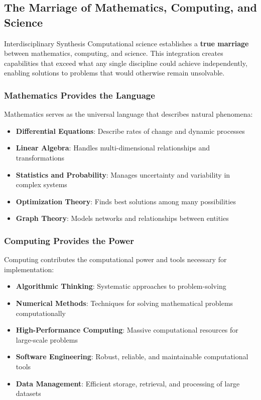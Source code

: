 \subsection{The Marriage of Mathematics, Computing, and Science}

\begin{highlightbox}{Interdisciplinary Synthesis}
Computational science establishes a \textbf{true marriage} between mathematics, computing, and science. This integration creates capabilities that exceed what any single discipline could achieve independently, enabling solutions to problems that would otherwise remain unsolvable.
\end{highlightbox}

\subsubsection{Mathematics Provides the Language}

Mathematics serves as the universal language that describes natural phenomena:
\begin{itemize}
    \item \textbf{Differential Equations}: Describe rates of change and dynamic processes
    \item \textbf{Linear Algebra}: Handles multi-dimensional relationships and transformations
    \item \textbf{Statistics and Probability}: Manages uncertainty and variability in complex systems
    \item \textbf{Optimization Theory}: Finds best solutions among many possibilities
    \item \textbf{Graph Theory}: Models networks and relationships between entities
\end{itemize}

\subsubsection{Computing Provides the Power}

Computing contributes the computational power and tools necessary for implementation:
\begin{itemize}
    \item \textbf{Algorithmic Thinking}: Systematic approaches to problem-solving
    \item \textbf{Numerical Methods}: Techniques for solving mathematical problems computationally
    \item \textbf{High-Performance Computing}: Massive computational resources for large-scale problems
    \item \textbf{Software Engineering}: Robust, reliable, and maintainable computational tools
    \item \textbf{Data Management}: Efficient storage, retrieval, and processing of large datasets
\end{itemize}

